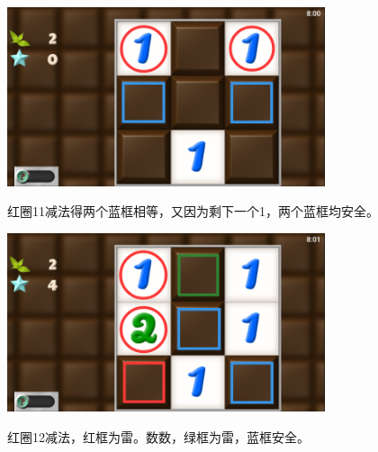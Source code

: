 \subsection{} %
\begin{center}
    \includegraphics[width=0.7\textwidth]{puzzle/12-1.png}
\end{center}
红圈11减法得两个蓝框相等，又因为剩下一个1，两个蓝框均安全。
\begin{center}
    \includegraphics[width=0.7\textwidth]{puzzle/12-2.png}
\end{center}
红圈12减法，红框为雷。数数，绿框为雷，蓝框安全。

